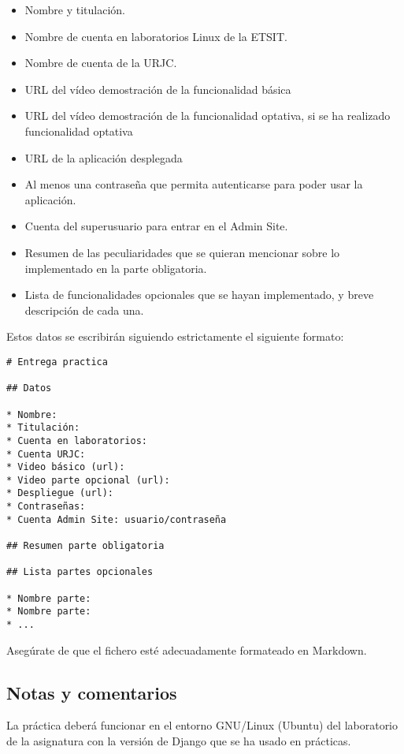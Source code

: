 \begin{itemize}
\begin{itemize}
  \item Nombre y titulación.
  \item Nombre de cuenta en laboratorios Linux de la ETSIT.
  \item Nombre de cuenta de la URJC.
  \item URL del vídeo demostración de la funcionalidad básica
  \item URL del vídeo demostración de la funcionalidad optativa, si se ha realizado funcionalidad optativa
  \item URL de la aplicación desplegada
  \item Al menos una contraseña que permita autenticarse para poder usar la aplicación.
  \item Cuenta del superusuario para entrar en el Admin Site.
  \item Resumen de las peculiaridades que se quieran mencionar sobre lo implementado en la parte obligatoria.
  \item Lista de funcionalidades opcionales que se hayan implementado, y breve descripción de cada una.
\end{itemize}

Estos datos se escribirán siguiendo estrictamente el siguiente formato:

\begin{verbatim}
# Entrega practica

## Datos

* Nombre:
* Titulación:
* Cuenta en laboratorios:
* Cuenta URJC:
* Video básico (url):
* Video parte opcional (url):
* Despliegue (url):
* Contraseñas:
* Cuenta Admin Site: usuario/contraseña

## Resumen parte obligatoria

## Lista partes opcionales

* Nombre parte:
* Nombre parte:
* ...
\end{verbatim}

Asegúrate de que el fichero esté adecuadamente formateado en Markdown.
\end{itemize}


\subsection{Notas y comentarios}

La práctica deberá funcionar en el entorno GNU/Linux (Ubuntu) del laboratorio de la asignatura con la versión de Django que se ha usado en prácticas.

